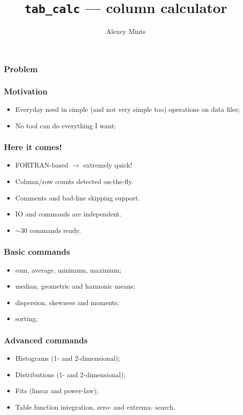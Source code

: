 \documentclass[14pt]{beamer}
\author{Alexey Mints}
\title{\texttt{tab\_calc} --- column calculator}
\begin{document}
\maketitle

\begin{frame}
 \frametitle{Problem}
 \begin{tiny} \end{tiny}
\end{frame}

\begin{frame}
 \frametitle{Motivation}
\begin{itemize}
 \item Everyday need in simple (and not very simple too) operations on data files;
 \item No tool can do everything I want;
\end{itemize}
\end{frame}

\begin{frame}
 \frametitle{Here it comes!}
\begin{itemize}
 \item FORTRAN-based $\xrightarrow{}$ extremely quick!
 \item Column/row counts detected on-the-fly.
 \item Comments and bad-line skipping support.
 \item IO and commands are independent.
 \item $\sim30$ commands ready.
\end{itemize}

\end{frame}

\begin{frame}
 \frametitle{Basic commands}
\begin{itemize}
 \item sum, average, minimum, maximum;
 \item median, geometric and harmonic means;
 \item dispersion, skewness and moments;
 \item sorting;
\end{itemize}
\end{frame}

\begin{frame}
 \frametitle{Advanced commands}
\begin{itemize}
 \item Histograms (1- and 2-dimensional);
 \item Distributions (1- and 2-dimensional);
 \item Fits (linear and power-law);
 \item Table function integration, zero- and extrema- search.
\end{itemize}
\end{frame}
\end{document}
